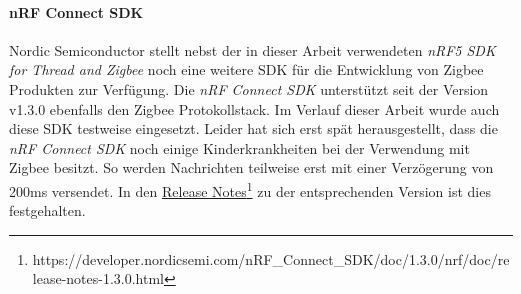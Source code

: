 \paragraph{nRF Connect SDK}
Nordic Semiconductor stellt nebst der in dieser Arbeit verwendeten \textit{nRF5 SDK for Thread and Zigbee} noch eine weitere SDK für die Entwicklung von Zigbee Produkten zur Verfügung.
Die \textit{nRF Connect SDK} unterstützt seit der Version v1.3.0 ebenfalls den Zigbee Protokollstack.
Im Verlauf dieser Arbeit wurde auch diese SDK testweise eingesetzt.
Leider hat sich erst spät herausgestellt, dass die \textit{nRF Connect SDK} noch einige Kinderkrankheiten bei der Verwendung mit Zigbee besitzt.
So werden Nachrichten teilweise erst mit einer Verzögerung von 200ms versendet. In den \href{https://developer.nordicsemi.com/nRF_Connect_SDK/doc/1.3.0/nrf/doc/release-notes-1.3.0.html}{Release Notes\footnote{\url{https://developer.nordicsemi.com/nRF_Connect_SDK/doc/1.3.0/nrf/doc/release-notes-1.3.0.html}}} zu der entsprechenden Version ist dies festgehalten. 
